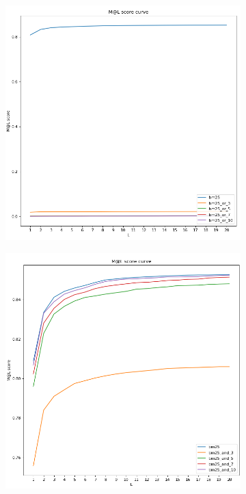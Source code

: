 \documentclass[10pt,a4paper,fleqn]{report}
\begin{document}
				\begin{figure}[htbp]
					\centering
					\begin{subfigure}[b]{0.48\textwidth}
						\centering
						\includegraphics[width=\textwidth]{figure/bm25_or.png}
						\caption{}
						\label{fig: hybrid_bm25_or}
					\end{subfigure}
					\hfill
					\begin{subfigure}[b]{0.48\textwidth}
						\centering
						\includegraphics[width=\textwidth]{figure/bm25_and.png}

\end{subfigure}
\end{figure}
\end{document}
